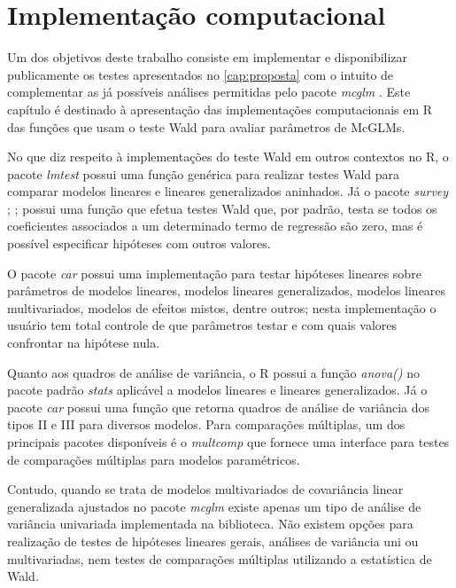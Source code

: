 
\chapter{Implementação computacional}

Um dos objetivos deste trabalho consiste em implementar e disponibilizar publicamente os testes apresentados no \autoref{cap:proposta} com o intuito de complementar as já possíveis análises permitidas pelo pacote \emph{mcglm} \citep{mcglm}. Este capítulo é destinado à apresentação das implementações computacionais em R das funções que usam o teste Wald para avaliar parâmetros de McGLMs.

No que diz respeito à implementações do teste Wald em outros contextos no R, o pacote \emph{lmtest} \citep{lmtest} possui uma função genérica para realizar testes Wald para comparar modelos lineares e lineares generalizados aninhados. Já o pacote \emph{survey} \citep{survey1}; \citep{survey2};\citep{survey3} possui uma função que efetua testes Wald que, por padrão, testa se todos os coeficientes associados a um determinado termo de regressão são zero, mas é possível especificar hipóteses com outros valores. 

O pacote \emph{car} \citep{car} possui uma implementação para testar hipóteses lineares sobre parâmetros de modelos lineares, modelos lineares generalizados, modelos lineares multivariados, modelos de efeitos mistos, dentre outros; nesta implementação o usuário tem total controle de que parâmetros testar e com quais valores confrontar na hipótese nula. 

Quanto aos quadros de análise de variância, o R possui a função \emph{anova()} no pacote padrão \emph{stats} \citep{softwareR} aplicável a modelos lineares e lineares generalizados. Já o pacote \emph{car} \citep{car} possui uma função que retorna quadros de análise de variância dos tipos II e III para diversos modelos. Para comparações múltiplas, um dos principais pacotes disponíveis é o \emph{multcomp} \citep{multcomp} que fornece uma interface para testes de comparações múltiplas para modelos paramétricos.

Contudo, quando se trata de modelos multivariados de covariância linear generalizada ajustados no pacote \emph{mcglm} existe apenas um tipo de análise de variância univariada implementada na biblioteca. Não existem opções para realização de testes de hipóteses lineares gerais, análises de variância uni ou multivariadas, nem testes de comparações múltiplas utilizando a estatística de Wald. 

